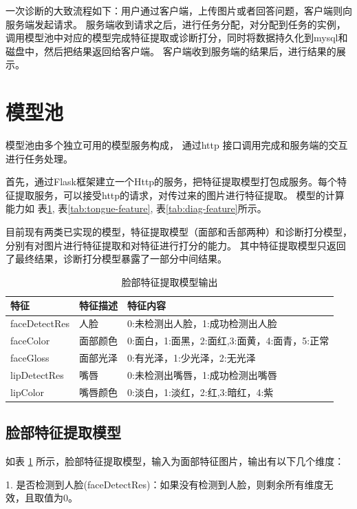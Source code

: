 一次诊断的大致流程如下：用户通过客户端，上传图片或者回答问题，客户端则向服务端发起请求。
服务端收到请求之后，进行任务分配，对分配到任务的实例，调用模型池中对应的模型完成特征提取或诊断打分，同时将数据持久化到mysql和磁盘中，然后把结果返回给客户端。
客户端收到服务端的结果后，进行结果的展示。

\section{模型池}

模型池由多个独立可用的模型服务构成， 通过http 接口调用完成和服务端的交互进行任务处理。

首先，通过Flask框架建立一个Http的服务，把特征提取模型打包成服务。每个特征提取服务，可以接受http的请求，对传过来的图片进行特征提取。
模型的计算能力如 表\ref{tab:face-feature}, 表\ref{tab:tongue-feature}, 表\ref{tab:diag-feature}所示。

目前现有两类已实现的模型，特征提取模型（面部和舌部两种）和诊断打分模型，分别有对图片进行特征提取和对特征进行打分的能力。
其中特征提取模型只返回了最终结果，诊断打分模型暴露了一部分中间结果。

\begin{table}[]
    \centering
    \begin{tabular}{lll}
        \toprule
        特征          & 特征描述     & 特征内容 \\ 
        \midrule
        faceDetectRes & 人脸   & 0:未检测出人脸，1:成功检测出人脸  \\
        faceColor     & 面部颜色 & 0:面白，1:面黑，2:面红,3:面黄，4:面青，5:正常 \\
        faceGloss     & 面部光泽 & 0:有光泽，1:少光泽，2:无光泽\\
        lipDetectRes  & 嘴唇   & 0:未检测出嘴唇，1:成功检测出嘴唇\\
        lipColor      & 嘴唇颜色 & 0:淡白，1:淡红，2:红,3:暗红，4:紫   \\
        \bottomrule
    \end{tabular}
    \caption{脸部特征提取模型输出}
    \label{tab:face-feature}
\end{table}

\subsection{脸部特征提取模型}
如表 \ref{tab:face-feature} 所示，脸部特征提取模型，输入为面部特征图片，输出有以下几个维度：

1. 是否检测到人脸(faceDetectRes)：如果没有检测到人脸，则剩余所有维度无效，且取值为0。

